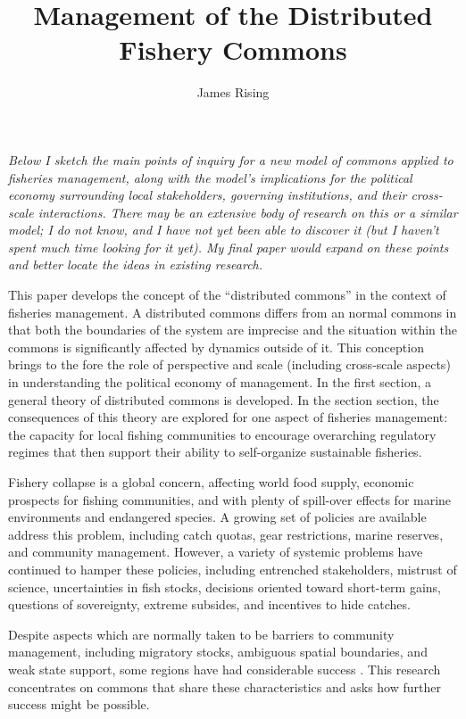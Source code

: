 \documentclass[12pt, oneside]{amsart}
\title{Management of the Distributed Fishery Commons}
\author{James Rising}
\begin{document}
\maketitle

\begin{singlespace}
{\it Below I sketch the main points of inquiry for a new model of commons applied to fisheries management, along with the model's implications for the political economy surrounding local stakeholders, governing institutions, and their cross-scale interactions.  There may be an extensive body of research on this or a similar model; I do not know, and I have not yet been able to discover it (but I haven't spent much time looking for it yet).  My final paper would expand on these points and better locate the ideas in existing research.}
\end{singlespace}

This paper develops the concept of the ``distributed commons'' in the context of fisheries management.  A distributed commons differs from an normal commons in that both the boundaries of the system are imprecise and the situation within the commons is significantly affected by dynamics outside of it.  This conception brings to the fore the role of perspective and scale (including cross-scale aspects) in understanding the political economy of management.  In the first section, a general theory of distributed commons is developed.  In the section section, the consequences of this theory are explored for one aspect of fisheries management: the capacity for local fishing communities to encourage overarching regulatory regimes that then support their ability to self-organize sustainable fisheries.

Fishery collapse is a global concern, affecting world food supply, economic prospects for fishing communities, and with plenty of spill-over effects for marine environments and endangered species. A growing set of policies are available address this problem, including catch quotas, gear restrictions, marine reserves, and community management.  However, a variety of systemic problems have continued to hamper these policies, including entrenched stakeholders, mistrust of science, uncertainties in fish stocks, decisions oriented toward short-term gains, questions of sovereignty, extreme subsides, and incentives to hide catches.

Despite aspects which are normally taken to be barriers to community management, including migratory stocks, ambiguous spatial boundaries, and weak state support, some regions have had considerable success \citep{pinho2012overcoming}.  This research concentrates on commons that share these characteristics and asks how further success might be possible.
\end{document}
